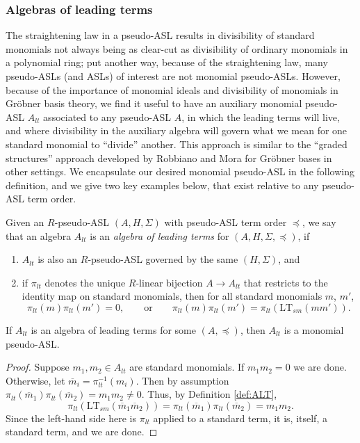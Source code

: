 \documentclass[11pt,reqno]{amsart}
\newcommand{\gb}{Gr\"{o}bner }
\newcommand{\ltsm}{\text{LT}_{sm}}
\theoremstyle{definition}
\numberwithin{equation}{section}
\begin{document}
\subsubsection{Algebras of leading terms}
\label{sec:algebra-leading-terms}
The straightening law in a pseudo-ASL results in divisibility of standard monomials not always being as clear-cut as divisibility of ordinary monomials in a polynomial ring; put another way, because of the straightening law, many pseudo-ASLs (and ASLs) of interest are not monomial pseudo-ASLs. However, because of the importance of monomial ideals and divisibility of monomials in \gb basis theory, we find it useful to have an auxiliary monomial pseudo-ASL $A_{lt}$ associated to any pseudo-ASL $A$, in which the leading terms will live, and where divisibility in the auxiliary algebra will govern what we mean for one standard monomial to ``divide'' another. This approach is similar to the ``graded structures'' approach developed by Robbiano \cite{robbiano} and Mora \cite{mora, moraIntro} for \gb bases in other settings. We encapsulate our desired monomial pseudo-ASL in the following definition, and we give two key examples below, that exist relative to any pseudo-ASL term order.

\begin{definition}[store=defalt, note=Algebra of leading terms] \label{def:ALT}
Given an $R$-pseudo-ASL $(A, H, \Sigma)$ with pseudo-ASL term order $\preceq$, we say that an algebra $A_{lt}$ is an \emph{algebra of leading terms} for $(A, H, \Sigma, \preceq)$, if 
\begin{enumerate}
\item \label{point:a-lt-asl} $A_{lt}$ is also an $R$-pseudo-ASL governed by the same $(H,\Sigma)$, and 
\item \label{point:pi-let} if $\pi_{lt}$ denotes the unique $R$-linear bijection $A \to A_{lt}$ that restricts to the identity map on standard monomials, then for all standard monomials $m$, $m'$, 
\[
\pi_{lt}(m)\pi_{lt}(m') = 0,\qquad \text{or}\qquad  \pi_{lt}(m)\pi_{lt}(m') = \pi_{lt}(\ltsm(mm')).
\]
\end{enumerate}
\end{definition}

\begin{lemma} \label{lem:ALT}
If $A_{lt}$ is an algebra of leading terms for some $(A,\preceq)$, then $A_{lt}$ is a monomial pseudo-ASL.
\end{lemma}

\begin{proof}
Suppose $m_1, m_2 \in A_{lt}$ are standard monomials. If $m_1 m_2 = 0$ we are done. Otherwise, let $\overline{m}_i = \pi_{lt}^{-1}(m_i)$. Then by assumption $\pi_{lt}(\overline{m}_1) \pi_{lt}(\overline{m}_2) = m_1 m_2 \neq 0$. Thus, by Definition \ref{def:ALT}, \[\pi_{lt}(\ltsm(\overline{m}_1 \overline{m}_2)) = \pi_{lt}(\overline{m}_1) \pi_{lt}(\overline{m}_2) = m_1 m_2.\] Since the left-hand side here is $\pi_{lt}$ applied to a standard term, it is, itself, a standard term, and we are done.
\end{proof}
\end{document}
